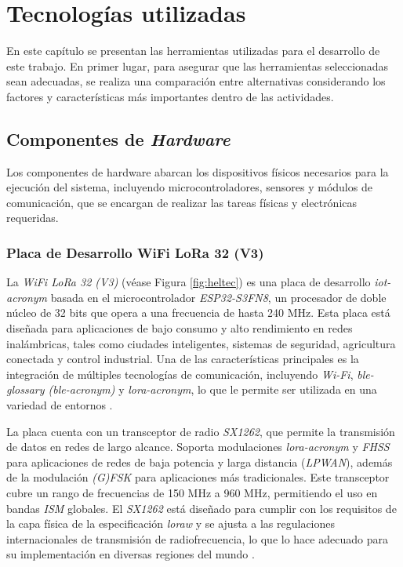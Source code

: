 \fancyhead{}
\fancyfoot{}
\pagestyle{plain}


\chapter{Tecnologías utilizadas}

En este capítulo se presentan las herramientas utilizadas para el desarrollo de este trabajo. En primer lugar, para asegurar que las herramientas seleccionadas sean adecuadas, se realiza una comparación entre alternativas considerando los factores y características más importantes dentro de las actividades.

\section{Componentes de \textit{Hardware}}

Los componentes de hardware abarcan los dispositivos físicos necesarios para la ejecución del sistema, incluyendo microcontroladores, sensores y módulos de comunicación, que se encargan de realizar las tareas físicas y electrónicas requeridas.

\subsection{Placa de Desarrollo WiFi LoRa 32 (V3)}

La \textit{WiFi LoRa 32 (V3)} (véase Figura \ref{fig:heltec}) es una placa de desarrollo \textit{\acrshort{iot-acronym}} basada en el microcontrolador \textit{ESP32-S3FN8}, un procesador de doble núcleo de 32 bits que opera a una frecuencia de hasta 240 MHz. Esta placa está diseñada para aplicaciones de bajo consumo y alto rendimiento en redes inalámbricas, tales como ciudades inteligentes, sistemas de seguridad, agricultura conectada y control industrial. Una de las características principales es la integración de múltiples tecnologías de comunicación, incluyendo \textit{Wi-Fi}, \textit{\gls{ble-glossary} (\acrshort{ble-acronym})} y \textit{\acrshort{lora-acronym}}, lo que le permite ser utilizada en una variedad de entornos \cite{WiFiLoRa32V3}.

La placa cuenta con un transceptor de radio \textit{SX1262}, que permite la transmisión de datos en redes de largo alcance. Soporta modulaciones \textit{\acrshort{lora-acronym}} y \textit{FHSS} para aplicaciones de redes de baja potencia y larga distancia (\textit{LPWAN}), además de la modulación \textit{(G)FSK} para aplicaciones más tradicionales. Este transceptor cubre un rango de frecuencias de 150 MHz a 960 MHz, permitiendo el uso en bandas \textit{ISM} globales. El \textit{SX1262} está diseñado para cumplir con los requisitos de la capa física de la especificación \textit{\acrshort{loraw}} y se ajusta a las regulaciones internacionales de transmisión de radiofrecuencia, lo que lo hace adecuado para su implementación en diversas regiones del mundo \cite{SX1262}.

